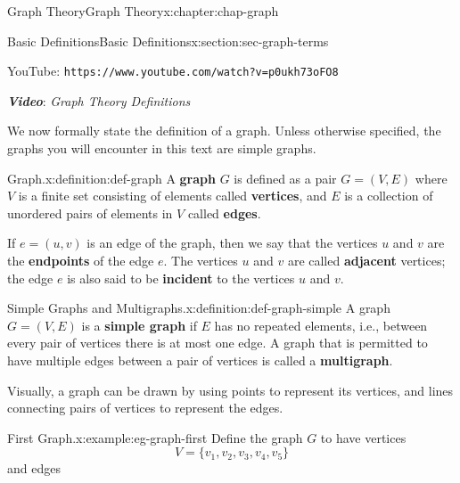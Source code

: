 \documentclass[oneside,10pt,]{book}
\newcommand{\mono}[1]{\texttt{#1}}
\newcommand{\alert}[1]{\textbf{\textit{#1}}}
\newcommand{\terminology}[1]{\textbf{#1}}
\numberwithin{equation}{section}
\newlength{\qrsize}
\newlength{\previewwidth}
\begin{document}
\begin{chapterptx}{Graph Theory}{}{Graph Theory}{}{}{x:chapter:chap-graph}
\begin{sectionptx}{Basic Definitions}{}{Basic Definitions}{}{}{x:section:sec-graph-terms}
\begin{sidebyside}{1}{0}{0}{0}
\begin{sbspanel}{1}
\begin{tcbraster}[raster columns=2, raster column skip=1pt, raster halign=center, raster force size=false, raster left skip=0pt, raster right skip=0pt]
\begin{tcolorbox}[previewstyle, width=\previewwidth]
\end{tcolorbox}%
\begin{tcolorbox}[qrstyle]%
{\hypersetup{urlcolor=black}}%
\end{tcolorbox}%
\begin{tcolorbox}[captionstyle]%
\small YouTube: \mono{https://www.youtube.com/watch?v=p0ukh73oFO8}\end{tcolorbox}%
\end{tcbraster}%
\end{sbspanel}%
\end{sidebyside}%
\par
\alert{Video}: \emph{Graph Theory Definitions}%
\par
We now formally state the definition of a graph. Unless otherwise specified, the graphs you will encounter in this text are simple graphs.%
\begin{definition}{Graph.}{x:definition:def-graph}%
A \terminology{graph} \(G\) is defined as a pair \(G = (V,E)\) where \(V\) is a finite set consisting of elements called \terminology{vertices}, and \(E\) is a collection of unordered pairs of elements in \(V\) called \terminology{edges}.%
\par
If \(e = (u,v)\) is an edge of the graph, then we say that the vertices \(u\) and \(v\) are the \terminology{endpoints} of the edge \(e\). The vertices \(u\) and \(v\) are called \terminology{adjacent} vertices; the edge \(e\) is also said to be \terminology{incident} to the vertices \(u\) and \(v\).%
\end{definition}
\begin{definition}{Simple Graphs and Multigraphs.}{x:definition:def-graph-simple}%
A graph \(G = (V,E)\) is a \terminology{simple graph} if \(E\) has no repeated elements, i.e.\@, between every pair of vertices there is at most one edge. A graph that is permitted to have multiple edges between a pair of vertices is called a \terminology{multigraph}.%
\end{definition}
Visually, a graph can be drawn by using points to represent its vertices, and lines connecting pairs of vertices to represent the edges.%
\begin{example}{First Graph.}{x:example:eg-graph-first}%
Define the graph \(G\) to have vertices%
\begin{equation*}
V = \{v_1,v_2,v_3,v_4,v_5\}
\end{equation*}
and edges%
\begin{equation*}

\end{equation*}
\end{example}
\end{sectionptx}
\end{chapterptx}
\end{document}
